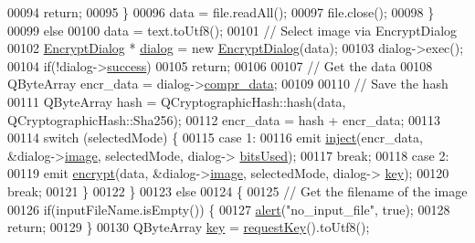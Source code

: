\begin{DoxyCode}
00094                 \textcolor{keywordflow}{return};
00095             \}
00096             data = file.readAll();
00097             file.close();
00098         \}
00099         \textcolor{keywordflow}{else}
00100             data = text.toUtf8();
00101         \textcolor{comment}{// Select image via EncryptDialog}
00102         \hyperlink{class_encrypt_dialog}{EncryptDialog} * \hyperlink{class_view_p_c_a31abbb470fe329b44e6ffee202b903ca}{dialog} = \textcolor{keyword}{new} \hyperlink{class_encrypt_dialog}{EncryptDialog}(data);
00103         dialog->exec();
00104         \textcolor{keywordflow}{if}(!dialog->\hyperlink{class_encrypt_dialog_ada4900bcd40894d9c098c65aa4066ac9}{success})
00105             \textcolor{keywordflow}{return};
00106 
00107         \textcolor{comment}{// Get the data}
00108         QByteArray encr\_data = dialog->\hyperlink{class_encrypt_dialog_a3e8998aa39696cbd1242f6420ef18143}{compr\_data};
00109 
00110         \textcolor{comment}{// Save the hash}
00111         QByteArray hash = QCryptographicHash::hash(data, QCryptographicHash::Sha256);
00112         encr\_data = hash + encr\_data;
00113 
00114         \textcolor{keywordflow}{switch} (selectedMode) \{
00115         \textcolor{keywordflow}{case} 1:
00116             emit \hyperlink{class_view_p_c_a652c98014c2df32178d43a5a9612dd99}{inject}(encr\_data, &dialog->\hyperlink{class_encrypt_dialog_a739a0df1d28d06b28a3fd16e2bc16c73}{image}, selectedMode, dialog->
      \hyperlink{class_encrypt_dialog_abf638fea37fbdbaba215954e2e239860}{bitsUsed});
00117             \textcolor{keywordflow}{break};
00118         \textcolor{keywordflow}{case} 2:
00119             emit \hyperlink{class_view_p_c_a9d179ff85ed8b1ca0ff7fa495965b52d}{encrypt}(data, &dialog->\hyperlink{class_encrypt_dialog_a739a0df1d28d06b28a3fd16e2bc16c73}{image}, selectedMode, dialog->
      \hyperlink{class_encrypt_dialog_a1afdef3c665fb0d0fae06d1df8e84951}{key});
00120             \textcolor{keywordflow}{break};
00121         \}
00122     \}
00123     \textcolor{keywordflow}{else}
00124     \{
00125         \textcolor{comment}{// Get the filename of the image}
00126         \textcolor{keywordflow}{if}(inputFileName.isEmpty()) \{
00127             \hyperlink{class_view_p_c_a7c467169467789561078abc9d4fe57bd}{alert}(\textcolor{stringliteral}{"no\_input\_file"}, \textcolor{keyword}{true});
00128             \textcolor{keywordflow}{return};
00129         \}
00130         QByteArray \hyperlink{namespace_errors_dict_setup_a09c268098d09ffb8e5504f30fa6d5dd9}{key} = \hyperlink{class_view_p_c_a559c95675ec98b15451f3bca47033d9c}{requestKey}().toUtf8();

\end{DoxyCode}
